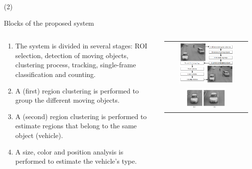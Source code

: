\begin{frame}{ (2)}


\begin{block}{Blocks of the proposed system} 
\begin{columns}
\begin{column}{0.6\textwidth}
		\begin{enumerate}
\item The system is divided in several stages: ROI selection, detection of moving objects, clustering process, tracking, single-frame classification and counting. 	
        \item A (first) region clustering is performed to group the
different moving objects.
        \item A (second) region clustering is performed to estimate regions that belong to the same object (vehicle).
        \item A size, color and position analysis is performed to estimate the vehicle's type.
		\end{enumerate}
\end{column}
\begin{column}{0.4\textwidth}  
    \begin{center}
     \begin{tabular}{c}
         \includegraphics[width=0.7\textwidth]{Figs/TrafficFlow}\\
          \includegraphics[width=0.5\textwidth]{Figs/RegionClustering_Vehicular}\\

\end{tabular}
\end{center}
\end{column}
\end{columns}
\end{block}
\end{frame}
